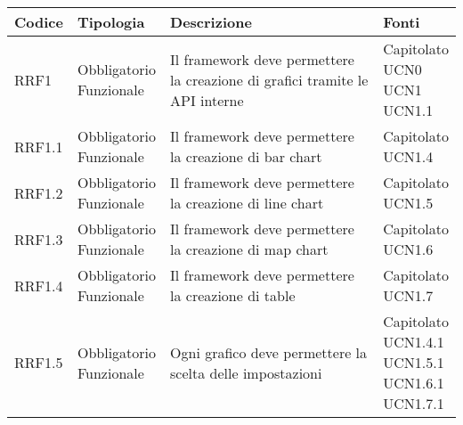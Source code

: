 
				
				\begin{longtabu}[c]{|X[0.7,l]|X[l]|X[2.5,l]|X[l]|}
				    \hline
					\rowfont{\bf \centering}
				    Codice &
					Tipologia &
					Descrizione &
					Fonti \\
					\hline
					\endhead
					
					
                RRF1 & 
                \parbox[t]{4cm}{ Obbligatorio \\ Funzionale} & Il framework deve permettere la creazione di grafici tramite le API interne & \parbox[t]{4cm}{Capitolato \\ UCN0 \\ UCN1 \\ UCN1.1 }  \\ 
                \hline
                
                RRF1.1 & 
                \parbox[t]{4cm}{ Obbligatorio \\ Funzionale} & Il framework deve permettere la creazione di bar chart & \parbox[t]{4cm}{Capitolato \\ UCN1.4 }  \\ 
                \hline
                
                RRF1.2 & 
                \parbox[t]{4cm}{ Obbligatorio \\ Funzionale} & Il framework deve permettere la creazione di line chart & \parbox[t]{4cm}{Capitolato \\ UCN1.5 }  \\ 
                \hline
                
                RRF1.3 & 
                \parbox[t]{4cm}{ Obbligatorio \\ Funzionale} & Il framework deve permettere la creazione di map chart & \parbox[t]{4cm}{Capitolato \\ UCN1.6 }  \\ 
                \hline
                
                RRF1.4 & 
                \parbox[t]{4cm}{ Obbligatorio \\ Funzionale} & Il framework deve permettere la creazione di table & \parbox[t]{4cm}{Capitolato \\ UCN1.7 }  \\ 
                \hline
                
                RRF1.5 & 
                \parbox[t]{4cm}{ Obbligatorio \\ Funzionale} & Ogni grafico deve permettere la scelta delle impostazioni & \parbox[t]{4cm}{Capitolato \\ UCN1.4.1 \\ UCN1.5.1 \\ UCN1.6.1 \\ UCN1.7.1 }  \\ 
                \hline
                

\end{longtabu}

